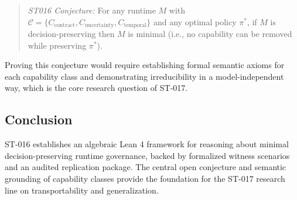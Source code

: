 \begin{quote}
\textit{ST016 Conjecture:} For any runtime $M$ with $\mathcal{C} =
\{C_{\text{contract}}, C_{\text{uncertainty}}, C_{\text{temporal}}\}$
and any optimal policy $\pi^*$, if $M$ is decision-preserving then $M$ is
minimal (i.e., no capability can be removed while preserving $\pi^*$).
\end{quote}

Proving this conjecture would require establishing formal semantic axioms for
each capability class and demonstrating irreducibility in a model-independent
way, which is the core research question of ST-017.

\subsection{Conclusion}
ST-016 establishes an algebraic Lean 4 framework for reasoning about minimal
decision-preserving runtime governance, backed by formalized witness scenarios
and an audited replication package. The central open conjecture and semantic
grounding of capability classes provide the foundation for the ST-017 research
line on transportability and generalization.
